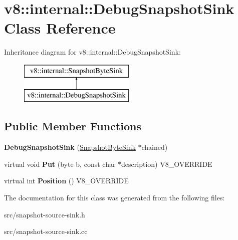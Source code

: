 \hypertarget{classv8_1_1internal_1_1_debug_snapshot_sink}{}\section{v8\+:\+:internal\+:\+:Debug\+Snapshot\+Sink Class Reference}
\label{classv8_1_1internal_1_1_debug_snapshot_sink}
Inheritance diagram for v8\+:\+:internal\+:\+:Debug\+Snapshot\+Sink\+:\begin{figure}[H]
\begin{center}
\leavevmode
\includegraphics[height=2.000000cm]{classv8_1_1internal_1_1_debug_snapshot_sink}
\end{center}
\end{figure}
\subsection*{Public Member Functions}
\begin{DoxyCompactItemize}
\item 
\hypertarget{classv8_1_1internal_1_1_debug_snapshot_sink_af4a383752f5af109a4c61cac7467467e}{}{\bfseries Debug\+Snapshot\+Sink} (\hyperlink{classv8_1_1internal_1_1_snapshot_byte_sink}{Snapshot\+Byte\+Sink} $\ast$chained)\label{classv8_1_1internal_1_1_debug_snapshot_sink_af4a383752f5af109a4c61cac7467467e}

\item 
\hypertarget{classv8_1_1internal_1_1_debug_snapshot_sink_a831a0d54364c5ec1857d91735f035c5d}{}virtual void {\bfseries Put} (byte b, const char $\ast$description) V8\+\_\+\+O\+V\+E\+R\+R\+I\+D\+E\label{classv8_1_1internal_1_1_debug_snapshot_sink_a831a0d54364c5ec1857d91735f035c5d}

\item 
\hypertarget{classv8_1_1internal_1_1_debug_snapshot_sink_a8b6ed59c3fabc33251658c89c2b9ed28}{}virtual int {\bfseries Position} () V8\+\_\+\+O\+V\+E\+R\+R\+I\+D\+E\label{classv8_1_1internal_1_1_debug_snapshot_sink_a8b6ed59c3fabc33251658c89c2b9ed28}

\end{DoxyCompactItemize}


The documentation for this class was generated from the following files\+:\begin{DoxyCompactItemize}
\item 
src/snapshot-\/source-\/sink.\+h\item 
src/snapshot-\/source-\/sink.\+cc\end{DoxyCompactItemize}

